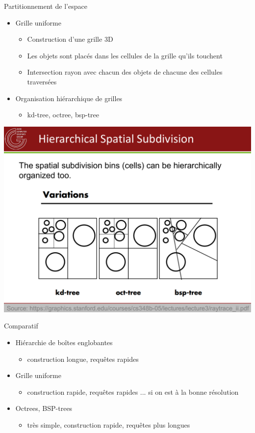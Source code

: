 \begin{frame}{Partitionnement de l'espace}
    \begin{itemize}
        \item Grille uniforme 
        \begin{itemize}
            \item Construction d'une grille 3D 
            \item Les objets sont placés dans les cellules de la grille qu'ils touchent 
            \item Intersection rayon avec chacun des objets de chacune des cellules traversées 
        \end{itemize}
        \item Organisation hiérarchique de grilles 
        \begin{itemize}
            \item kd-tree, octree, bsp-tree
        \end{itemize} 
    \end{itemize}
    \begin{center}
        \includegraphics[width=.8\textwidth]{figs/trees.pdf}
    \end{center}
\end{frame}

\begin{frame}{Comparatif}
    \begin{itemize}
        \item Hiérarchie de boîtes englobantes 
        \begin{itemize}
            \item construction longue, requêtes rapides 
        \end{itemize}
        \item Grille uniforme 
        \begin{itemize}
            \item construction rapide, requêtes rapides ... si on est à la bonne résolution
        \end{itemize}
        \item Octrees, BSP-trees
        \begin{itemize}
            \item très simple, construction rapide, requêtes plus longues
        \end{itemize}
    \end{itemize}
\end{frame}